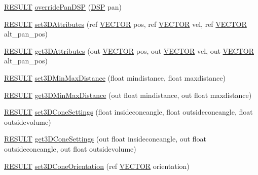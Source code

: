 \begin{DoxyCompactItemize}
\item 
\hyperlink{namespace_f_m_o_d_a305d1176ef3f8c8815861a60407ac33d}{R\+E\+S\+U\+LT} \hyperlink{class_f_m_o_d_1_1_channel_control_ab6539476d7e3b79d4356422bc49f811e}{override\+Pan\+D\+SP} (\hyperlink{class_f_m_o_d_1_1_d_s_p}{D\+SP} pan)
\item 
\hyperlink{namespace_f_m_o_d_a305d1176ef3f8c8815861a60407ac33d}{R\+E\+S\+U\+LT} \hyperlink{class_f_m_o_d_1_1_channel_control_a1e7fa92958d154fe2e38afc04dc4872d}{set3\+D\+Attributes} (ref \hyperlink{struct_f_m_o_d_1_1_v_e_c_t_o_r}{V\+E\+C\+T\+OR} pos, ref \hyperlink{struct_f_m_o_d_1_1_v_e_c_t_o_r}{V\+E\+C\+T\+OR} vel, ref \hyperlink{struct_f_m_o_d_1_1_v_e_c_t_o_r}{V\+E\+C\+T\+OR} alt\+\_\+pan\+\_\+pos)
\item 
\hyperlink{namespace_f_m_o_d_a305d1176ef3f8c8815861a60407ac33d}{R\+E\+S\+U\+LT} \hyperlink{class_f_m_o_d_1_1_channel_control_abb570cc41bcd21d9df1f95ecbf113000}{get3\+D\+Attributes} (out \hyperlink{struct_f_m_o_d_1_1_v_e_c_t_o_r}{V\+E\+C\+T\+OR} pos, out \hyperlink{struct_f_m_o_d_1_1_v_e_c_t_o_r}{V\+E\+C\+T\+OR} vel, out \hyperlink{struct_f_m_o_d_1_1_v_e_c_t_o_r}{V\+E\+C\+T\+OR} alt\+\_\+pan\+\_\+pos)
\item 
\hyperlink{namespace_f_m_o_d_a305d1176ef3f8c8815861a60407ac33d}{R\+E\+S\+U\+LT} \hyperlink{class_f_m_o_d_1_1_channel_control_a1e433bd6955e04eba7b19d7955ee0dbd}{set3\+D\+Min\+Max\+Distance} (float mindistance, float maxdistance)
\item 
\hyperlink{namespace_f_m_o_d_a305d1176ef3f8c8815861a60407ac33d}{R\+E\+S\+U\+LT} \hyperlink{class_f_m_o_d_1_1_channel_control_af77382df86fde844f472d799355aa34d}{get3\+D\+Min\+Max\+Distance} (out float mindistance, out float maxdistance)
\item 
\hyperlink{namespace_f_m_o_d_a305d1176ef3f8c8815861a60407ac33d}{R\+E\+S\+U\+LT} \hyperlink{class_f_m_o_d_1_1_channel_control_a4c4b9fe62ea80d0cbdaab3ff51567645}{set3\+D\+Cone\+Settings} (float insideconeangle, float outsideconeangle, float outsidevolume)
\item 
\hyperlink{namespace_f_m_o_d_a305d1176ef3f8c8815861a60407ac33d}{R\+E\+S\+U\+LT} \hyperlink{class_f_m_o_d_1_1_channel_control_a98b5a71f36cb75c08f0788129c694e63}{get3\+D\+Cone\+Settings} (out float insideconeangle, out float outsideconeangle, out float outsidevolume)
\item 
\hyperlink{namespace_f_m_o_d_a305d1176ef3f8c8815861a60407ac33d}{R\+E\+S\+U\+LT} \hyperlink{class_f_m_o_d_1_1_channel_control_acee125e81aef0664619c4efdaacda27f}{set3\+D\+Cone\+Orientation} (ref \hyperlink{struct_f_m_o_d_1_1_v_e_c_t_o_r}{V\+E\+C\+T\+OR} orientation)

\end{DoxyCompactItemize}
